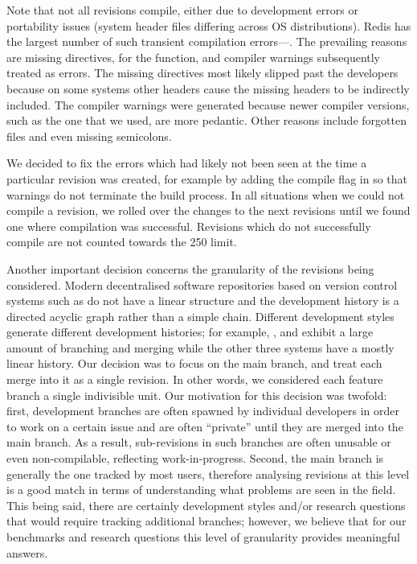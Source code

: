 Note that not all revisions compile, either due to development errors
or portability issues (\eg system header files differing across OS
distributions).
Redis has the largest number of such transient compilation
errors---\redisTransientCompErrs.  The prevailing reasons are missing
 directives, \eg {} for the  function,
and compiler warnings subsequently treated as errors.  The missing
 directives most likely slipped past the developers because on
some systems other  headers cause the missing headers to be
indirectly included. The compiler warnings were generated because newer
compiler versions, such as the one that we used, are more pedantic.  Other
reasons include forgotten files and even missing semicolons.

We decided to fix the errors which had likely not been seen at the time a
particular revision was created, for example by adding the compile flag
 in \binutils so that warnings do not terminate the build
process. In all situations when we could not compile a revision, we rolled over
the changes to the next revisions until we found one where compilation was
successful.  Revisions which do not successfully compile are not counted
towards the 250 limit.

Another important decision concerns the granularity of the revisions
being considered.  Modern decentralised software repositories based on
version control systems such as \git do not have a linear structure
and the development history is a directed acyclic graph rather than a
simple chain.  Different development styles generate different
development histories; for example, \git, \redis and \zeromq exhibit a
large amount of branching and merging while the other three systems
have a mostly linear history.  Our decision was to focus on the main branch,
and treat each merge into it as a single revision. In other words, we
considered each feature branch a single indivisible unit.  Our
motivation for this decision was twofold: first, development branches
are often spawned by individual developers in order to work on a
certain issue and are often ``private'' until they are merged into the
main branch.  As a result, sub-revisions in such branches are often
unusable or even non-compilable, reflecting work-in-progress.  Second,
the main branch is generally the one tracked by most users, therefore
analysing revisions at this level is a good match in terms of
understanding what problems are seen in the field.  This being said,
there are certainly development styles and/or research questions that
would require tracking additional branches; however, we believe that
for our benchmarks and research questions this level of granularity
provides meaningful answers.

